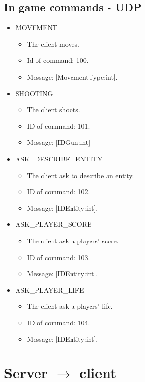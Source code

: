 \documentclass[a4 paper, 12pt]{report}
\begin{document}
\subsection{In game commands - UDP}
\begin{itemize}
\item MOVEMENT
  \begin{itemize}
  \item The client moves.
  \item Id of command: 100.
  \item Message: [MovementType:int].
  \end{itemize}

\item SHOOTING
  \begin{itemize}
  \item The client shoots.
  \item ID of command: 101.
  \item Message: [IDGun:int].
  \end{itemize}

\item ASK\_DESCRIBE\_ENTITY
  \begin{itemize}
  \item The client ask to describe an entity.
  \item ID of command: 102.
  \item Message: [IDEntity:int].
  \end{itemize}

\item ASK\_PLAYER\_SCORE
  \begin{itemize}
  \item The client ask a players' score.
  \item ID of command: 103.
  \item Message: [IDEntity:int].
  \end{itemize}

\item ASK\_PLAYER\_LIFE
  \begin{itemize}
  \item The client ask a players' life.
  \item ID of command: 104.
  \item Message: [IDEntity:int].
  \end{itemize}
\end{itemize}

\section{Server $\rightarrow$ client}
\end{document}
